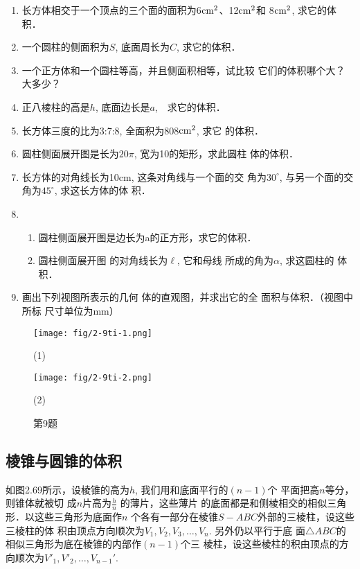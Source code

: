 \begin{ex}
\begin{enumerate}
    \item 长方体相交于一个顶点的三个面的面积为6${\rm cm^2}$、12${\rm cm^2}$和
    8${\rm cm^2}$, 求它的体积．
    \item 一个圆柱的侧面积为$S$, 底面周长为$C$, 求它的体积．
    \item 一个正方体和一个圆柱等高，并且侧面积相等，试比较
    它们的体积哪个大？大多少？
    \item 正八棱柱的高是$h$, 底面边长是$a$,　求它的体积．
    \item 
    长方体三度的比为3:7:8, 全面积为808${\rm cm^2}$, 求它
    的体积．
    \item 
    圆柱侧面展开图是长为$20\pi$, 宽为10的矩形，求此圆柱
    体的体积．
    \item 长方体的对角线长为10cm, 这条对角线与一个面的交
    角为$30^{\circ}$, 与另一个面的交角为$45^{\circ}$, 求这长方体的体
    积．
\item \begin{enumerate}
    \item 圆柱侧面展开图是边长为a的正方形，求它的体积．
    \item 圆柱侧面展开图
的对角线长为$\ell$, 它和母线
所成的角为$\alpha$, 求这圆柱的
体积．
\end{enumerate}

\item 画出下列视图所表示的几何
体的直观图，并求出它的全
面积与体积．（视图中所标
尺寸单位为mm）
\end{enumerate}
\end{ex}

\begin{figure}[htp]\centering
    \begin{minipage}[t]{0.48\textwidth}
    \centering
\texttt{[image: fig/2-9ti-1.png]}
    \caption*{(1)}
    \end{minipage}
    \begin{minipage}[t]{0.48\textwidth}
    \centering
\texttt{[image: fig/2-9ti-2.png]}
    \caption*{(2)}
    \end{minipage}
    \caption*{第9题}
    \end{figure}


\subsection{棱锥与圆锥的体积}

如图2.69所示，设棱锥的高为$h$, 
我们用和底面平行的$(n-1)$个
平面把高$n$等分，则锥体就被切
成$n$片高为$\frac{h}{n}$
的薄片，这些薄片
的底面都是和侧棱相交的相似三角形．以这些三角形为底面作$n$
个各有一部分在棱锥$S-ABC$外部的三棱柱，设这些三棱柱的体
积由顶点方向顺次为$V_1,V_2,V_3,\ldots,V_n$. 另外仍以平行于底
面$\triangle ABC$的相似三角形为底在棱锥的内部作$(n-1)$个三
棱柱，设这些棱柱的积由顶点的方向顺次为$V'_1,V'_2,\ldots,V_{n-1}'$.

